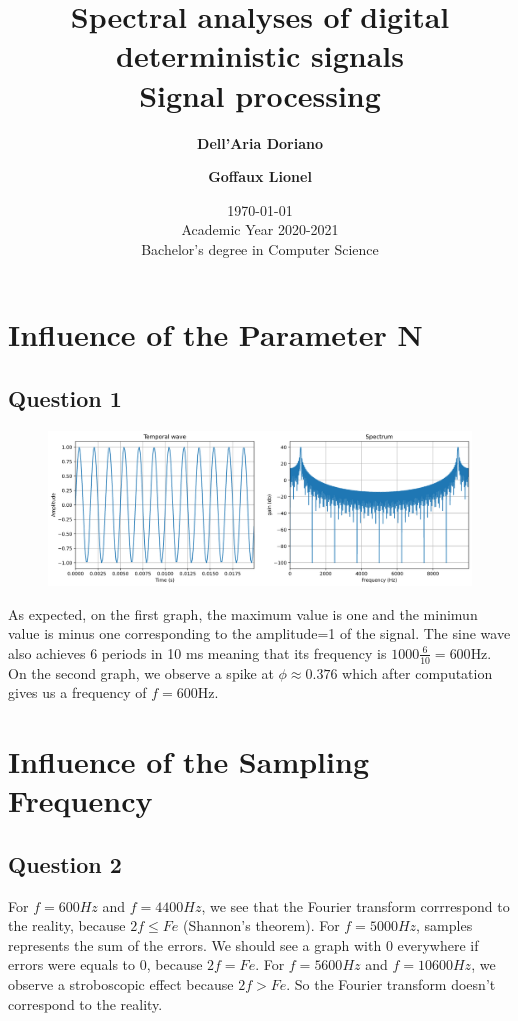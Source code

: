 \documentclass[]{article}
\title{
{\Huge Spectral
analyses of digital
deterministic signals}\\
Signal processing\\
}
\author{
\textbf{Dell’Aria Doriano}\\
\and
\textbf{Goffaux Lionel}
}
\date{\today\\
Academic Year 2020-2021\\
Bachelor's degree in Computer Science\\}
\begin{document}
\maketitle

\section{Influence of the Parameter N}
\subsection*{Question 1}

\begin{figure}[h]
    \centering
    \includegraphics[scale=0.25]{q1.png}
\end{figure}

As expected, on the first graph, the maximum value is one and the minimun value is minus one corresponding to the amplitude=1 of the signal.
The sine wave also achieves 6 periods in 10 ms meaning that its frequency is $ 1000\frac{6}{10}=600 \text{Hz} $.
On the second graph, we observe a spike at $ \phi\approx0.376 $ which after computation gives us a frequency of $ f=600\text{Hz} $.

\section{Influence of the Sampling Frequency}
\subsection*{Question 2}


For $f=600Hz$ and $f=4400Hz$, we see that the Fourier transform corrrespond to the reality, because $2f \leq Fe$ (Shannon's theorem).  
For $f=5000Hz$, samples represents the sum of the errors. We should see a graph with 0 everywhere if errors were equals to 0, because $2f = Fe$.  
For $f=5600Hz$ and $f=10600Hz$, we observe a stroboscopic effect because $2f > Fe$. So the Fourier transform doesn't correspond to the reality.
\end{document}
